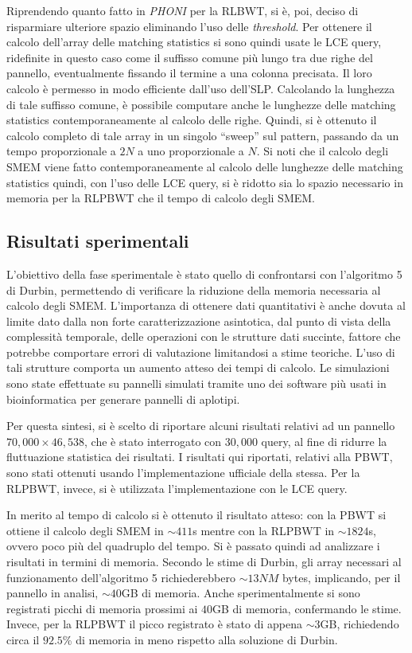 \documentclass[a4paper,11pt, oneside,italian]{article}
\begin{document}
Riprendendo quanto fatto in \textit{PHONI} per
la RLBWT, si è, poi, deciso di risparmiare ulteriore spazio eliminando
l'uso delle \textit{threshold}. Per ottenere il calcolo dell'array delle
matching statistics si sono quindi usate le LCE query, ridefinite in questo caso
come il suffisso comune più lungo tra due righe del pannello, eventualmente
fissando il termine a una colonna precisata. Il loro calcolo è permesso
in modo efficiente dall'uso dell'SLP. Calcolando la
lunghezza di tale suffisso comune, è possibile computare anche le
lunghezze delle matching statistics contemporaneamente al calcolo delle
righe. Quindi, si è ottenuto il calcolo completo di tale array in
un singolo ``sweep'' sul pattern, passando da un tempo proporzionale a
$2N$ a uno proporzionale a $N$. Si noti che il calcolo degli SMEM viene fatto
contemporaneamente al calcolo delle lunghezze delle matching statistics quindi,
con l'uso delle LCE query, si è ridotto sia lo spazio necessario in memoria per
la RLPBWT che il tempo di calcolo degli SMEM.

\subsection*{Risultati sperimentali}
L'obiettivo della fase sperimentale è stato quello di confrontarsi con
l'algoritmo 5 di Durbin, permettendo di verificare la
riduzione della memoria necessaria al calcolo degli SMEM. L'importanza di
ottenere dati quantitativi è anche dovuta al limite 
dato dalla non forte caratterizzazione asintotica, dal punto di vista della
complessità temporale, delle operazioni con le strutture dati succinte, fattore
che potrebbe comportare errori di 
valutazione limitandosi a stime teoriche. L'uso di tali strutture comporta un
aumento atteso  
dei tempi di calcolo. Le simulazioni sono state effettuate su pannelli simulati
tramite uno dei software più usati in bioinformatica per generare pannelli di
aplotipi. 

Per questa sintesi, si è scelto di riportare alcuni risultati relativi ad un
pannello $70,000 \times 46,538$, che è stato interrogato con $30,000$ query, al
fine di ridurre la fluttuazione statistica dei risultati.
I risultati qui riportati, relativi alla PBWT, sono stati ottenuti usando
l'implementazione ufficiale della stessa. Per la RLPBWT, invece, si è utilizzata
l'implementazione con le LCE query. 

In merito al tempo di calcolo si è ottenuto il risultato atteso: con
la PBWT si ottiene il calcolo degli SMEM in $\sim 411$s 
mentre con la RLPBWT in $\sim 1824$s, ovvero poco più del quadruplo del tempo.
Si è passato quindi ad analizzare i risultati in termini di memoria. Secondo le
stime di Durbin, gli array necessari al funzionamento dell'algoritmo 5
richiederebbero $\sim 13NM$ bytes, implicando, per il pannello in analisi, $\sim
40$GB di memoria. Anche sperimentalmente si sono registrati 
picchi di memoria prossimi ai $40$GB di memoria, confermando le stime. Invece,
per la RLPBWT il picco registrato è stato di appena $\sim 3$GB, richiedendo
circa il $92.5$\% di memoria in meno rispetto alla soluzione di Durbin.
\end{document}

